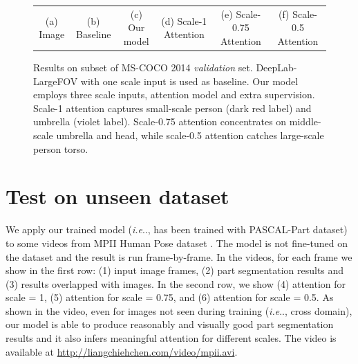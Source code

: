 \documentclass[10pt,twocolumn,letterpaper]{article}
\makeatletter
\def\@onedot{\ifx\@let@token.\else.\null\fi\xspace}
\DeclareRobustCommand\onedot{\futurelet\@let@token\@onedot}
\def\ie{\emph{i.e}\onedot} \def\Ie{\emph{I.e}\onedot}
\makeatother
\begin{document}
\begin{figure}[!h]
{\begin{tabular}{c c c c c c}
   {\scriptsize (a) Image} & 
   {\scriptsize (b) Baseline} & 
   {\scriptsize (c) Our model} & 
   {\scriptsize (d) Scale-1 Attention} & 
   {\scriptsize (e) Scale-0.75 Attention} &
   {\scriptsize (f) Scale-0.5 Attention} \\
  \end{tabular}
  }
  \caption{Results on subset of MS-COCO 2014 {\it validation} set. DeepLab-LargeFOV with one scale input is used as baseline. Our model employs three scale inputs, attention model and extra supervision. Scale-1 attention captures small-scale person (dark red label) and umbrella (violet label). Scale-0.75 attention concentrates on middle-scale umbrella and head, while scale-0.5 attention catches large-scale person torso.}
  \label{fig:pascal_coco_results}  
\end{figure}

\section{Test on unseen dataset}
We apply our trained model (\ie, has been trained with PASCAL-Part dataset) to some videos from MPII Human Pose dataset \cite{andriluka14cvpr}. The model is not fine-tuned on the dataset and the result is run frame-by-frame. In the videos, for each frame we show in the first row: (1) input image frames, (2) part segmentation results and (3) results overlapped with images. In the second row, we show (4) attention for scale = 1, (5) attention for scale = 0.75, and (6) attention for scale = 0.5. As shown in the video, even for images not seen during training (\ie, cross domain), our model is able to produce reasonably and visually good part segmentation results and it also infers meaningful attention for different scales. The video is available at \url{http://liangchiehchen.com/video/mpii.avi}.
\end{document}
